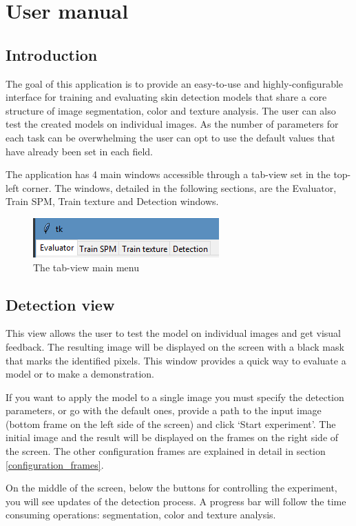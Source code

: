 \documentclass[12pt]{report}
\begin{document}
	\chapter{User manual}
	\section{Introduction}
	The goal of this application is to provide an easy-to-use and highly-configurable interface for training and evaluating skin detection models that share a core structure of image segmentation, color and texture analysis. The user can also test the created models on individual images. As the number of parameters for each task can be overwhelming the user can opt to use the default values that have already been set in each field.
	
	The application has 4 main windows accessible through a tab-view set in the top-left corner. The windows, detailed in the following sections, are the Evaluator, Train SPM, Train texture and Detection windows.
	
	\begin{figure}[h]
		\centering
		\includegraphics{manual/tab_view.png}
		\caption{The tab-view main menu}
	\end{figure}

	\section{Detection view}
	This view allows the user to test the model on individual images and get visual feedback. The resulting image will be displayed on the screen with a black mask that marks the identified pixels. This window provides a quick way to evaluate a model or to make a demonstration.
	
	If you want to apply the model to a single image you must specify the detection parameters, or go with the default ones, provide a path to the input image (bottom frame on the left side of the screen) and click ‘Start experiment’. The initial image and the result will be displayed on the frames on the right side of the screen. The other configuration frames are explained in detail in section \ref{configuration_frames}. 
	
	On the middle of the screen, below the buttons for controlling the experiment, you will see updates of the detection process. A progress bar will follow the time consuming operations: segmentation, color and texture analysis.
\end{document}
